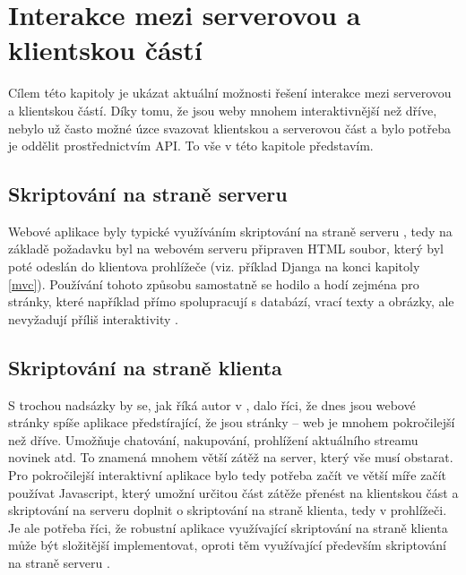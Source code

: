     \section{Interakce mezi serverovou a klientskou částí}\label{interakce}
    Cílem této kapitoly je ukázat aktuální možnosti řešení interakce mezi serverovou a klientskou částí. Díky tomu, že jsou weby mnohem interaktivnější než dříve, nebylo už často možné úzce svazovat klientskou a serverovou část a bylo potřeba je oddělit prostřednictvím API. To vše v této kapitole představím.
    
        \subsection{Skriptování na straně serveru}
        Webové aplikace byly typické využíváním skriptování na straně serveru \cite{moderni-webapps}, tedy na základě požadavku byl na webovém serveru připraven HTML soubor, který byl poté odeslán do klientova prohlížeče \cite{scripting-sqa} (viz. příklad Djanga na konci kapitoly \ref{mvc}). Používání tohoto způsobu samostatně se hodilo a hodí zejména pro stránky, které například přímo spolupracují s databází, vrací texty a obrázky, ale nevyžadují příliš interaktivity \cite{scripting-freecodecamp}.
        
        \subsection{Skriptování na straně klienta}\label{client-side-scripting}
        S trochou nadsázky by se, jak říká autor v \cite{scripting-freecodecamp}, dalo říci, že dnes jsou webové stránky spíše aplikace předstírající, že jsou stránky -- web je mnohem pokročilejší než dříve. Umožňuje chatování, nakupování, prohlížení aktuálního streamu novinek atd. To znamená mnohem větší zátěž na server, který vše musí obstarat. Pro pokročilejší interaktivní aplikace bylo tedy potřeba začít ve větší míře začít používat Javascript, který umožní určitou část zátěže přenést na klientskou část \cite{scripting-upwork} a skriptování na serveru doplnit o skriptování na straně klienta, tedy v prohlížeči. Je ale potřeba říci, že robustní aplikace využívající skriptování na straně klienta může být složitější implementovat, oproti těm využívající především skriptování na straně serveru \cite{scripting-fasthosts}.
        
